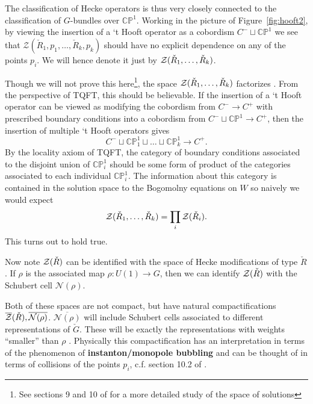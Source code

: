 	The classification of Hecke operators is thus very closely connected to the classification of $G$-bundles over $\mathbb{CP}^1$. 
	Working in the picture of Figure~\ref{fig:hooft2}, by viewing the insertion of a `t Hooft operator as a cobordism $C^- \sqcup \mathbb{CP}^1$ we see that $\mathcal Z(\check R_1, p_1, \dots, \check R_k, p_k)$ should have no explicit dependence on any of the points $p_i$. We will hence denote it just by $\mathcal{Z}(\check R_1, \dots, \check R_k)$.
	
	Though we will not prove this here\footnote{See sections 9 and 10 of \cite{kapustin2006} for a more detailed study of the space of solutions}, the space $\mathcal{Z}(\check R_1, \dots, \check R_k)$ factorizes . From the perspective of TQFT, this should be believable. If the insertion of a `t Hooft operator can be viewed as modifying the cobordism from $C^- \to C^+$ with prescribed boundary conditions into a cobordism from $C^- \sqcup \mathbb{CP}^1 \to C^+$, then the insertion of multiple `t Hooft operators gives
	\[
		C^- \sqcup \mathbb{CP}^1_1 \sqcup \dots \sqcup \mathbb{CP}^1_k \to C^+.
	\]
	By the locality axiom of TQFT, the category of boundary conditions associated to the disjoint union of $\mathbb{CP}^1_i$ should be some form of product of the categories associated to each individual $\mathbb{CP}^1_i$. The information about this category is contained in the solution space to the Bogomolny equations on $W$ so naively we would expect 
	\[
		\mathcal{Z}(\check R_1, \dots, \check R_k) = \prod_{i} \mathcal{Z}(\check R_i).
	\]
	This turns out to hold true.
	
	Now note
		$\mathcal{Z}(\check R)$ can be identified with the space of Hecke modifications of type $\check R$. If $\rho$ is the associated map $\rho: U(1) \to G$, then we can identify $\mathcal{Z}(\check R)$ with the Schubert cell $\mathcal N(\rho)$. 
	
	Both of these spaces are not compact, but have natural compactifications $\overline {\mathcal{Z}}(\check R), \overline{\mathcal N(\rho)}$. $\overline {\mathcal N(\rho)}$ will include Schubert cells associated to different representations of $\check G$. These will be exactly the representations with weights ``smaller'' than $\rho$ \cite{witten2010}. Physically this compactification has an interpretation in terms of the phenomenon of \textbf{instanton/monopole bubbling} and can be thought of in terms of collisions of the points $p_i$, c.f. section 10.2 of \cite{kapustin2006}.
	
